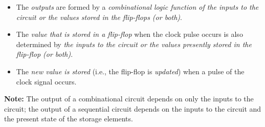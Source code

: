 \begin{itemize}
  \item The \textit{outputs} are formed by a \textit{combinational logic function of the inputs to the circuit or the values stored in the flip-flops (or both)}. 
  \item The \textit{value that is stored in a flip-flop} when the clock pulse occurs is also determined by \textit{the inputs to the circuit or the values presently stored in the flip-flop (or both)}.
  \item The \textit{new value is stored} (i.e., the flip-flop is \textit{updated}) when a pulse of the clock signal occurs.
\end{itemize}

\textbf{Note:} The output of a combinational circuit depends on only the inputs to the circuit; the output of a sequential circuit depends on the inputs to the circuit and the present state of the storage elements.
